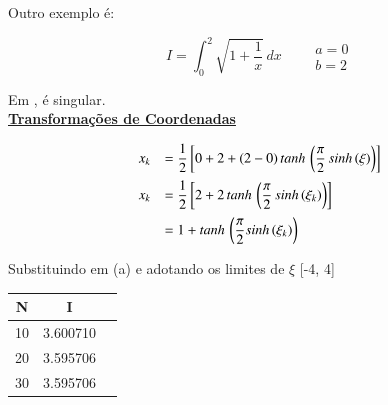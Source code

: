 Outro exemplo é:

\[
  I = \int_0^2 \sqrt{1 + \frac{1}{x}} \, dx \qquad
 \begin{array}{l}
  a = 0 \\
  b = 2
 \end{array}
\]

Em ,  é singular.\\

\underline{\textbf{Transformações de Coordenadas}}

\begin{equation}
 \label{cap2:sec8:eq10}
 \begin{array}{ll}
  x_k & = \displaystyle \frac{1}{2} \left[ 0 + 2 + (2 - 0) \, tanh \, \left( \frac{\pi}{2} \, sinh\,(\xi) \right) \right] \vspace*{0.2cm} \\
  x_k & = \displaystyle \frac{1}{2} \left[ 2 + 2 \, tanh \, \left( \frac{\pi}{2} \, sinh\,(\xi_k) \right) \right] \vspace*{0.2cm} \\
      & = 1 + tanh \, \left( \displaystyle \frac{\pi}{2} sinh\,(\xi_k) \right)
 \end{array}
\end{equation}

Substituindo em (a) e adotando os limites de $\xi$ [-4, 4]

{
\footnotesize
	\begin{center}
		\begin{tabular}{|c|c|c|}
		\hline		
		\textbf{N} & \textbf{I} \\
		\hline \hline
		10 & 3.600710 \\
		\hline
		20 & 3.595706 \\
		\hline
		30 & 3.595706 \\
		\hline
		\end{tabular}
	\end{center}
	\label{cap2:sec6:tab3}
}